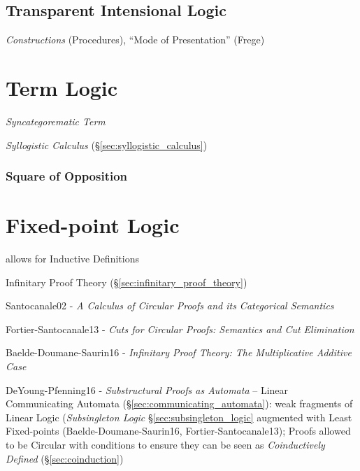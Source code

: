 \subsection{Transparent Intensional Logic}
\label{sec:transparent_intensional_logic}

\emph{Constructions} (Procedures), ``Mode of Presentation'' (Frege)



\section{Term Logic}\label{sec:term_logic}

\emph{Syncategorematic Term}

\emph{Syllogistic Calculus} (\S\ref{sec:syllogistic_calculus})



\subsubsection{Square of Opposition}\label{sec:square_of_opposition}



\section{Fixed-point Logic}\label{sec:fixedpoint_logic}

allows for Inductive Definitions

\fist Infinitary Proof Theory (\S\ref{sec:infinitary_proof_theory})

Santocanale02 - \emph{A Calculus of Circular Proofs and its
  Categorical Semantics}

Fortier-Santocanale13 - \emph{Cuts for Circular Proofs: Semantics and
  Cut Elimination}

Baelde-Doumane-Saurin16 - \emph{Infinitary Proof Theory: The
  Multiplicative Additive Case}

\asterism

DeYoung-Pfenning16 - \emph{Substructural Proofs as Automata} -- Linear
Communicating Automata (\S\ref{sec:communicating_automata}): weak
fragments of Linear Logic (\emph{Subsingleton Logic}
\S\ref{sec:subsingleton_logic} augmented with Least Fixed-points
(Baelde-Doumane-Saurin16, Fortier-Santocanale13); Proofs allowed to be
Circular with conditions to ensure they can be seen as
\emph{Coinductively Defined} (\S\ref{sec:coinduction})

